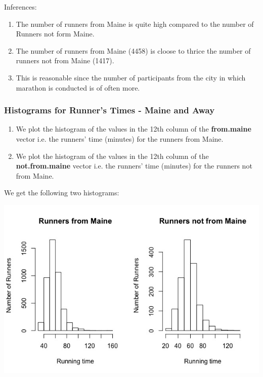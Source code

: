 \documentclass[12pt,letterpaper,titlepage,en-US]{article}
\begin{document}
Inferences:
\begin{enumerate}
\item The number of runners from Maine is quite high compared to the number of Runners not form Maine.
\item The number of runners from Maine (4458) is cloose to thrice the number of runners not from Maine (1417).
\item This is reasonable since the number of participants from the city in which marathon is conducted is of often more.



\end{enumerate}

\subsubsection{Histograms for Runner's Times - Maine and Away}



\begin{enumerate}
\item We plot the histogram of the values in the 12th column of the \textbf{from.maine} vector i.e. the runners' time (minutes) for the runners from Maine.
\item We plot the histogram of the values in the 12th column of the \textbf{not.from.maine} vector i.e. the runners' time (minutes) for the runners not from Maine.
\end{enumerate}

We get the following two histograms:
\begin{center}
\includegraphics[scale=0.6]{1b.jpeg}
\end{center}
\end{document}
